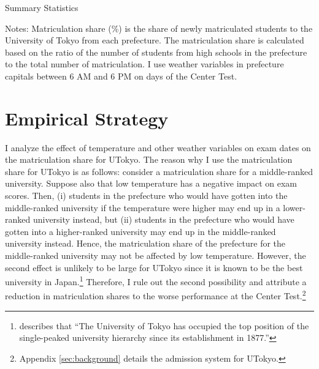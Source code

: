 \documentclass[12pt,letterpaper]{article}
\begin{document}
\begin{table}[!htbp]
  \centering
  \caption{Summary Statistics}
  \resizebox{0.8\linewidth}{!}{
  
  }
  \label{tab:sum_stat}
  \footnotesize
  \begin{tablenotes}
    \item 
      Notes:
      Matriculation share (\%) is the share of newly matriculated students to the University of Tokyo from each prefecture.
      The matriculation share is calculated based on the ratio of the number of students from high schools in the prefecture to the total number of matriculation.
      I use weather variables in prefecture capitals between 6 AM and 6 PM on days of the Center Test.
  \end{tablenotes}
\end{table}

\section{Empirical Strategy}\label{sec:empirical_strategy}

I analyze the effect of temperature and other weather variables on exam dates on the matriculation share for UTokyo.
The reason why I use the matriculation share for UTokyo is as follows:
consider a matriculation share for a middle-ranked university.
Suppose also that low temperature has a negative impact on exam scores.
Then, 
(i) students in the prefecture who would have gotten into the middle-ranked university if the temperature were higher may end up in a lower-ranked university instead, but
(ii) students in the prefecture who would have gotten into a higher-ranked university may end up in the middle-ranked university instead.
Hence, the matriculation share of the prefecture for the middle-ranked university may not be affected by low temperature.
However, the second effect is unlikely to be large for UTokyo since it is known to be the best university in Japan.\footnote{
  \citet{Kawaguchi2008} describes that ``The University of Tokyo has occupied the top position of the single-peaked university hierarchy since its establishment in 1877.''
}
Therefore, I rule out the second possibility and attribute a reduction in matriculation shares to the worse performance at the Center Test.\footnote{
  Appendix \ref{sec:background} details the admission system for UTokyo.
}
\end{document}
